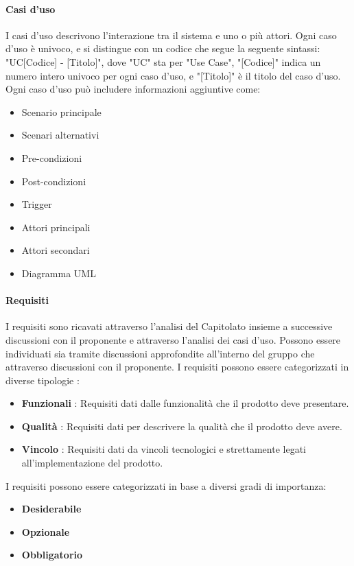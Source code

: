 \paragraph{Casi d'uso} 
I casi d'uso descrivono l'interazione tra il sistema e uno o più attori. Ogni caso d'uso è univoco, e si distingue con un codice che segue la seguente sintassi: "UC[Codice] - [Titolo]",
dove "UC" sta per "Use Case", "[Codice]" indica un numero intero univoco per ogni caso d'uso, e "[Titolo]" è il titolo del caso d'uso. 
Ogni caso d'uso può includere informazioni aggiuntive come:
\begin{itemize}
    \item Scenario principale
    \item Scenari alternativi
    \item Pre-condizioni
    \item Post-condizioni
    \item Trigger
    \item Attori principali
    \item Attori secondari
    \item Diagramma UML
\end{itemize}

\paragraph{Requisiti} 
I requisiti sono ricavati attraverso l’analisi del Capitolato insieme a successive discussioni con il proponente e attraverso l’analisi dei casi d’uso.
Possono essere individuati sia tramite discussioni approfondite all’interno del gruppo che attraverso discussioni con il proponente.
I requisiti possono essere categorizzati in diverse tipologie : 
\begin{itemize}
    \item \textbf{Funzionali} : Requisiti dati dalle funzionalità che il prodotto deve presentare.
    \item \textbf{Qualità} : Requisiti dati per descrivere la qualità che il prodotto deve avere.
    \item \textbf{Vincolo} : Requisiti dati da vincoli tecnologici e strettamente legati all’implementazione del prodotto.
\end{itemize}
I requisiti possono essere categorizzati in base a diversi gradi di importanza:
\begin{itemize}
    \item \textbf{Desiderabile}
    \item \textbf{Opzionale} 
    \item \textbf{Obbligatorio}
\end{itemize}

